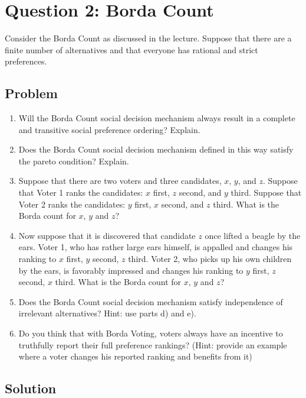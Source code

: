 \documentclass[12pt]{article}
\begin{document}
\newpage
\section{Question 2: Borda Count}

\noindent
Consider the Borda Count as discussed in the lecture. Suppose that there are a finite number of alternatives and that everyone has rational and strict preferences.

\subsection{Problem}
\begin{enumerate}[label=(\alph*)]
    \item Will the Borda Count social decision mechanism always result in a complete and transitive social preference ordering? Explain.
    \item Does the Borda Count social decision mechanism defined in this way satisfy the pareto condition? Explain.
    \item Suppose that there are two voters and three candidates, $x$, $y$, and $z$. Suppose that Voter 1 ranks the candidates: $x$ first, $z$ second, and $y$ third. Suppose that Voter 2 ranks the candidates: $y$ first, $x$ second, and $z$ third. What is the Borda count for $x$, $y$ and $z$?
    \item Now suppose that it is discovered that candidate $z$ once lifted a beagle by the ears. Voter 1, who has rather large ears himself, is appalled and changes his ranking to $x$ first, $y$ second, $z$ third. Voter 2, who picks up his own children by the ears, is favorably impressed and changes his ranking to $y$ first, $z$ second, $x$ third. What is the Borda count for $x$, $y$ and $z$?
    \item Does the Borda Count social decision mechanism satisfy independence of irrelevant alternatives? Hint: use parts d) and e).
    \item Do you think that with Borda Voting, voters always have an incentive to truthfully report their full preference rankings? (Hint: provide an example where a voter changes his reported ranking and benefits from it)
\end{enumerate}

\newpage
\subsection{Solution}
\end{document}

